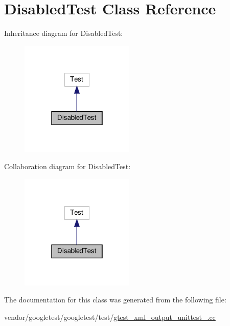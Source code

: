 \hypertarget{class_disabled_test}{}\section{Disabled\+Test Class Reference}
\label{class_disabled_test}


Inheritance diagram for Disabled\+Test\+:
\nopagebreak
\begin{figure}[H]
\begin{center}
\leavevmode
\includegraphics[width=154pt]{class_disabled_test__inherit__graph}
\end{center}
\end{figure}


Collaboration diagram for Disabled\+Test\+:
\nopagebreak
\begin{figure}[H]
\begin{center}
\leavevmode
\includegraphics[width=154pt]{class_disabled_test__coll__graph}
\end{center}
\end{figure}


The documentation for this class was generated from the following file\+:\begin{DoxyCompactItemize}
\item 
vendor/googletest/googletest/test/\hyperlink{gtest__xml__output__unittest___8cc}{gtest\+\_\+xml\+\_\+output\+\_\+unittest\+\_\+.\+cc}\end{DoxyCompactItemize}
